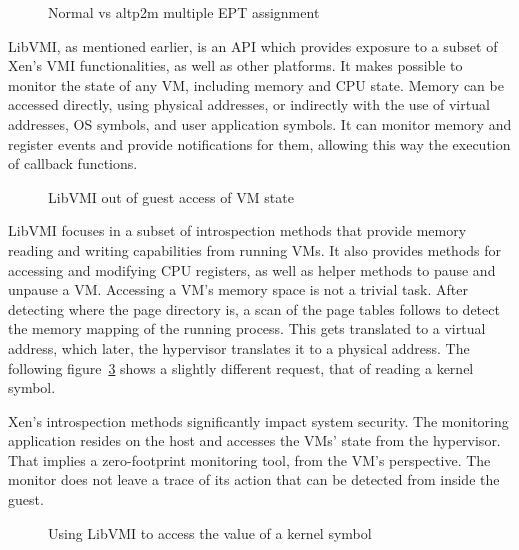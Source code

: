 \begin{figure}[ht]
	\centering
	\scalebox{0.95}{}
	\caption{Normal vs altp2m multiple \ac{EPT} assignment}
	\label{fig:ept}
\end{figure}

\par LibVMI, as mentioned earlier, is an \ac{API} which provides exposure to a subset of Xen’s \ac{VMI} functionalities, as well as other platforms. It makes possible to monitor the state of any \ac{VM}, including memory and \ac{CPU} state. Memory can be accessed directly, using physical addresses, or indirectly with the use of virtual addresses, \ac{OS} symbols, and user application symbols. It can monitor memory and register events and provide notifications for them, allowing this way the execution of callback functions. 


\begin{figure}[ht]
	\centering
	
	\caption{LibVMI out of guest access of \ac{VM} state}
	\label{fig:libvmi}
\end{figure}

\par LibVMI focuses in a subset of introspection methods that provide memory reading and writing capabilities from running \ac{VM}s. It also provides methods for accessing and modifying \ac{CPU} registers, as well as helper methods to pause and unpause a \ac{VM}. Accessing a \ac{VM}'s memory space is not a trivial task. After detecting where the page directory is, a scan of the page tables follows to detect the memory mapping of the running process. This gets translated to a virtual address, which later, the hypervisor translates it to a physical address. The following figure~\ref{fig:accesskernel} shows a slightly different request, that of reading a kernel symbol.

\par Xen’s introspection methods significantly impact system security. The monitoring application resides on the host and accesses the \ac{VM}s' state from the hypervisor. That implies a zero-footprint monitoring tool, from the \ac{VM}'s perspective. The monitor does not leave a trace of its action that can be detected from inside the guest.

\begin{figure}[ht]
	\centering
	
	\caption{Using LibVMI to access the value of a kernel symbol}
	\label{fig:accesskernel}
\end{figure}

